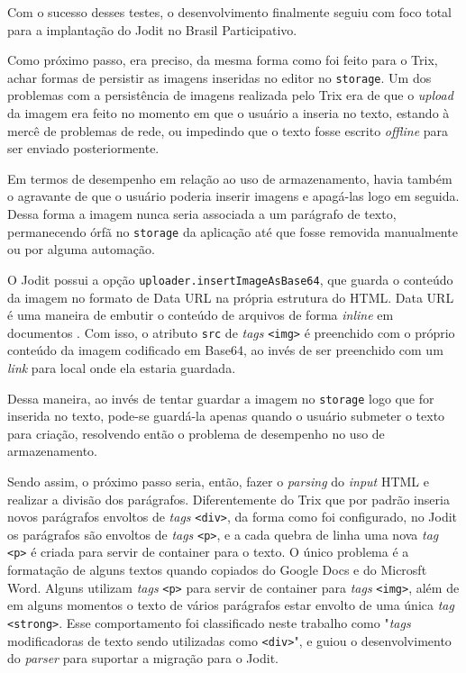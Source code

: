 Com o sucesso desses testes, o desenvolvimento finalmente seguiu com foco total para a implantação do Jodit no Brasil Participativo.

Como próximo passo, era preciso, da mesma forma como foi feito para o Trix, achar formas de persistir as imagens inseridas no editor no \texttt{storage}. Um dos problemas com a persistência de imagens realizada pelo Trix era de que o \textit{upload} da imagem era feito no momento em que o usuário a inseria no texto, estando à mercê de problemas de rede, ou impedindo que o texto fosse escrito \textit{offline} para ser enviado posteriormente.

Em termos de desempenho em relação ao uso de armazenamento, havia também o agravante de que o usuário poderia inserir imagens e apagá-las logo em seguida.
Dessa forma a imagem nunca seria associada a um parágrafo de texto, permanecendo órfã no \texttt{storage} da aplicação até que fosse removida manualmente ou por alguma automação.

O Jodit possui a opção \texttt{uploader.insertImageAsBase64}, que guarda o conteúdo da imagem no formato de Data URL na própria estrutura do HTML.
Data URL é uma maneira de embutir o conteúdo de arquivos de forma \textit{inline} em documentos \cite{data-urls-mdn}.
Com isso, o atributo \texttt{src} de \textit{tags} \texttt{<img>} é preenchido com o próprio conteúdo da imagem codificado em Base64, ao invés de ser preenchido com um \textit{link} para local onde ela estaria guardada.

Dessa maneira, ao invés de tentar guardar a imagem no \texttt{storage} logo que for inserida no texto, pode-se guardá-la apenas quando o usuário submeter o texto para criação, resolvendo então o problema de desempenho no uso de armazenamento.

Sendo assim, o próximo passo seria, então, fazer o \textit{parsing} do \textit{input} HTML e realizar a divisão dos parágrafos. Diferentemente do Trix que por padrão inseria novos parágrafos envoltos de \textit{tags} \texttt{<div>}, da forma como foi configurado, no Jodit os parágrafos são envoltos de \textit{tags} \texttt{<p>}, e a cada quebra de linha uma nova \textit{tag} \texttt{<p>} é criada para servir de container para o texto.
O único problema é a formatação de alguns textos quando copiados do Google Docs e do Microsft Word. Alguns utilizam \textit{tags} \texttt{<p>} para servir de container para \textit{tags} \texttt{<img>}, além de em alguns momentos o texto de vários parágrafos estar envolto de uma única \textit{tag} \texttt{<strong>}. Esse comportamento foi classificado neste trabalho como "\textit{tags} modificadoras de texto sendo utilizadas como \texttt{<div>}", e guiou o desenvolvimento do \textit{parser} para suportar a migração para o Jodit.

